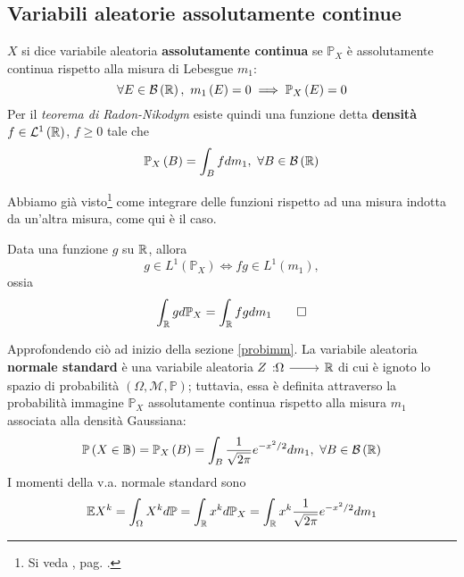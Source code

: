 \subsection{Variabili aleatorie assolutamente continue}
\begin{define}
	$X$ si dice variabile aleatoria \textbf{assolutamente continua} se $\mathbb{P}_X$ è assolutamente continua rispetto alla misura di Lebesgue $m_1$: %
	\begin{equation}
		\forall E\in\mathcal{B}\left(\mathbb{R}\right),\ m_1\left(E\right)=0\implies \mathbb{P}_X\left(E\right)=0
	\end{equation}
	Per il \textit{teorema di Radon-Nikodym} esiste quindi una funzione detta \textbf{densità} $f\in\mathcal{L}^1\left(\mathbb{R}\right)$, $f\geq 0$ tale che
	\begin{equation}
		\mathbb{P}_X\left(B\right)=\int_B fdm_1,\ \forall B\in\mathcal{B}\left(\mathbb{R}\right)
	\end{equation}
\end{define}
Abbiamo già visto\footnote{Si veda , pag. \pageref{misuraindotta}.} come integrare delle funzioni rispetto ad una misura indotta da un'altra misura, come qui è il caso.
\begin{theoremaqed}
	Data una funzione $g$ su $\mathbb{R}$, allora
	\begin{equation}
		g\in L^{1}\left(\mathbb{P}_X\right)\iff fg\in L^{1}\left(m_1\right),
	\end{equation}
	ossia
	\begin{equation}
		\int_{\mathbb{R}}gd\mathbb{P}_X=\int_{\mathbb{R}}fgdm_1\qedhere
	\end{equation}
\end{theoremaqed}
\begin{examplewt}
	Approfondendo ciò ad inizio della sezione \ref{probimm}. La variabile aleatoria \textbf{normale standard} è una variabile aleatoria $\funz{Z}{\Omega}{\realset}$ di cui è ignoto lo spazio di probabilità $\left(\Omega,\mathcal{M},\mathbb{P}\right)$; tuttavia, essa è definita attraverso la probabilità immagine $\mathbb{P}_X$ assolutamente continua rispetto alla misura $m_1$ associata alla densità Gaussiana:
	\begin{equation}
		\mathbb{P}\left(X\in\mathbb{B}\right)=\mathbb{P}_X\left(B\right)=\int_B\frac{1}{\sqrt{2\pi}}e^{-x^2/2}dm_1,\ \forall B\in\mathcal{B}\left(\realset\right)
	\end{equation}
	I momenti della v.a. normale standard sono
	\begin{equation*}
		\mathbb{E}X^k=\int_{\Omega}X^kd\mathbb{P}=\int_{\mathbb{R}}x^kd\mathbb{P}_X=\int_{\mathbb{R}}x^k\frac{1}{\sqrt{2\pi}}e^{-x^2/2}dm_1
	\end{equation*}
\end{examplewt}
